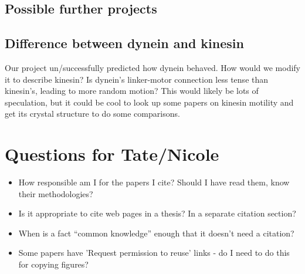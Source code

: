 \documentclass[10pt]{article} %
\begin{document}
\subsection{Possible further projects}
\subsection{Difference between dynein and kinesin}
Our project un/successfully predicted how dynein behaved. How would we modify it to describe kinesin?
Is dynein's linker-motor connection less tense than kinesin's, leading to more random motion? This
would likely be lots of speculation, but it could be cool to look up some papers on kinesin motility
and get its crystal structure to do some comparisons.





\section{Questions for Tate/Nicole}
\begin{itemize}
\item How responsible am I for the papers I cite? Should I have read them, know their methodologies?
\item Is it appropriate to cite web pages in a thesis? In a separate citation section?
\item When is a fact ``common knowledge'' enough that it doesn't need a citation?
\item Some papers have 'Request permission to reuse' links - do I need to do this for copying figures?
\end{itemize}
\end{document}
